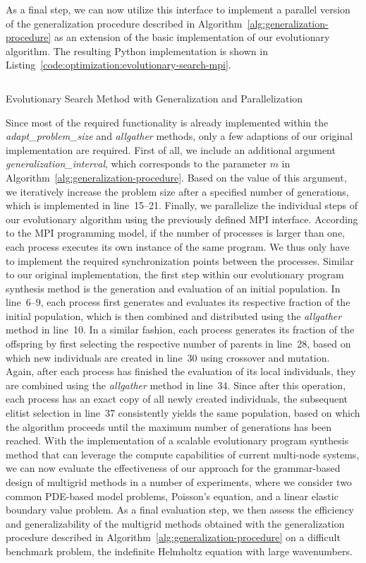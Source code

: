 As a final step, we can now utilize this interface to implement a parallel version of the generalization procedure described in Algorithm~\ref{alg:generalization-procedure} as an extension of the basic implementation of our evolutionary algorithm.
The resulting Python implementation is shown in Listing~\ref{code:optimization:evolutionary-search-mpi}.
\begin{listing}
	\inputminted[linenos]{python}{evostencils/optimization/evolutionary_search_mpi.py}
	\caption{Evolutionary Search Method with Generalization and Parallelization}
	\label{code:optimization:evolutionary-search-mpi}
\end{listing}
Since most of the required functionality is already implemented within the \emph{adapt\_problem\_size} and \emph{allgather} methods, only a few adaptions of our original implementation are required.
First of all, we include an additional argument \emph{generalization\_interval}, which corresponds to the parameter $m$ in Algorithm~\ref{alg:generalization-procedure}.
Based on the value of this argument, we iteratively increase the problem size after a specified number of generations, which is implemented in line~15--21.
Finally, we parallelize the individual steps of our evolutionary algorithm using the previously defined MPI interface.
According to the MPI programming model, if the number of processes is larger than one, each process executes its own instance of the same program.
We thus only have to implement the required synchronization points between the processes.
Similar to our original implementation, the first step within our evolutionary program synthesis method is the generation and evaluation of an initial population.
In line~6--9, each process first generates and evaluates its respective fraction of the initial population, which is then combined and distributed using the \emph{allgather} method in line~10.
In a similar fashion, each process generates its fraction of the offspring by first selecting the respective number of parents in line~28, based on which new individuals are created in line~30 using crossover and mutation.
Again, after each process has finished the evaluation of its local individuals, they are combined using the \emph{allgather} method in line~34.
Since after this operation, each process has an exact copy of all newly created individuals, the subsequent elitist selection in line~37 consistently yields the same population, based on which the algorithm proceeds until the maximum number of generations has been reached.
With the implementation of a scalable evolutionary program synthesis method that can leverage the compute capabilities of current multi-node systems, we can now evaluate the effectiveness of our approach for the grammar-based design of multigrid methods in a number of experiments, where we consider two common PDE-based model problems, Poisson's equation, and a linear elastic boundary value problem.
As a final evaluation step, we then assess the efficiency and generalizability of the multigrid methods obtained with the generalization procedure described in Algorithm~\ref{alg:generalization-procedure} on a difficult benchmark problem, the indefinite Helmholtz equation with large wavenumbers.

